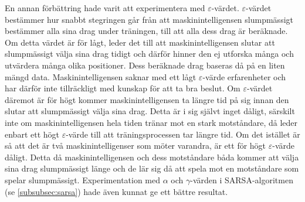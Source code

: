 \documentclass[12pt,a4paper]{article}
\begin{document}
  En annan förbättring hade varit att experimentera med $\varepsilon$-värdet. $\varepsilon$-värdet bestämmer hur snabbt stegringen går från att maskinintelligensen slumpmässigt bestämmer alla sina drag under träningen, till att alla dess drag är beräknade. Om detta värdet är för lågt, leder det till att maskinintelligensen slutar att slumpmässigt välja sina drag tidigt och därför hinner den ej utforska många och utvärdera många olika positioner. Dess beräknade drag baseras då på en liten mängd data. Maskinintelligensen saknar med ett lågt $\varepsilon$-värde erfarenheter och har därför inte tillräckligt med kunskap för att ta bra beslut. Om $\varepsilon$-värdet däremot är för högt kommer maskinintelligensen ta längre tid på sig innan den slutar att slumpmässigt välja sina drag. Detta är i sig självt inget dåligt, särskilt inte om maskinintelligensen hela tiden tränar mot en stark motståndare, då leder enbart ett högt $\varepsilon$-värde till att träningsprocessen tar längre tid. Om det istället är så att det är två maskinintelligenser som möter varandra, är ett för högt $\varepsilon$-värde dåligt. Detta då maskinintelligensen och dess motståndare båda kommer att välja sina drag slumpmässigt länge och de lär sig då att spela mot en motståndare som spelar slumpmässigt. Experimentation med $\alpha$ och $\gamma$-värden i SARSA-algoritmen (se \ref{subsubsec:sarsa}) hade även kunnat ge ett bättre resultat. 


  \cleardoublepage


  
  


  \cleardoublepage


  \appendix
\end{document}

